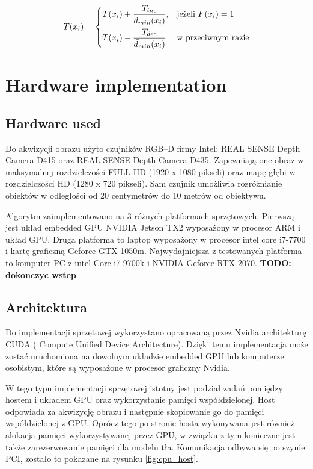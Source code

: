 \documentclass[b5paper,10pt,twoside]{article}
\begin{document}
{    \begin{equation}
	    T(x_i) = 
		\begin{dcases}
    		T(x_i) + \frac{T_{inc}}{\bar{d}_{min}(x_i)}, & \text{jeżeli } F(x_i)=1 \\
    		T(x_i) - \frac{T_{dec}}{\bar{d}_{min}(x_i)} & \text{w przeciwnym razie} 
		\end{dcases}
	\label{equ:pbas_t_update}	
	\end{equation}

\section{Hardware implementation}

\subsection{Hardware used}
\label{subsec:hw_used}

Do akwizycji obrazu użyto czujników RGB--D firmy Intel: REAL SENSE Depth Camera D415 oraz REAL SENSE Depth Camera D435. Zapewniają
one obraz w maksymalnej rozdzielczości FULL HD (1920 x 1080 pikseli) oraz mapę głębi w rozdzielczości HD (1280 x 720 pikseli). Sam czujnik umożliwia rozróżnianie obiektów w odległości od 20 centymetrów do 10 metrów od obiektywu.

Algorytm zaimplementowano na 3 różnych platformach sprzętowych. Pierwszą jest układ embedded GPU NVIDIA Jetson TX2 wyposażony w procesor ARM i układ GPU. Druga platforma to laptop wyposażony w procesor intel core i7-7700 i kartę graficzną Geforce GTX 1050m. Najwydajniejsza z testowanych platforma to komputer PC z intel Core i7-9700k i NVIDIA Geforce RTX 2070.
\textbf{TODO: dokonczyc wstep}

\subsection{Architektura}
\label{subsec:architecture}

Do implementacji sprzętowej wykorzystano opracowaną przez Nvidia architekturę CUDA ( Compute Unified Device Architecture). Dzięki temu implementacja może zostać uruchomiona na dowolnym układzie embedded GPU lub komputerze osobistym, które są wyposażone w procesor graficzny Nvidia. 

W tego typu implementacji sprzętowej istotny jest podział zadań pomiędzy hostem i układem GPU oraz wykorzystanie pamięci współdzielonej. Host odpowiada za akwizycję obrazu i następnie skopiowanie go do pamięci współdzielonej z GPU. Oprócz tego po stronie hosta wykonywana jest również alokacja pamięci wykorzystywanej przez GPU, w związku z tym konieczne jest także zarezerwowanie pamięci dla modelu tła. Komunikacja odbywa się po szynie PCI, zostało to pokazane na rysunku \ref{fig:cpu_host}. 


}
\end{document}
